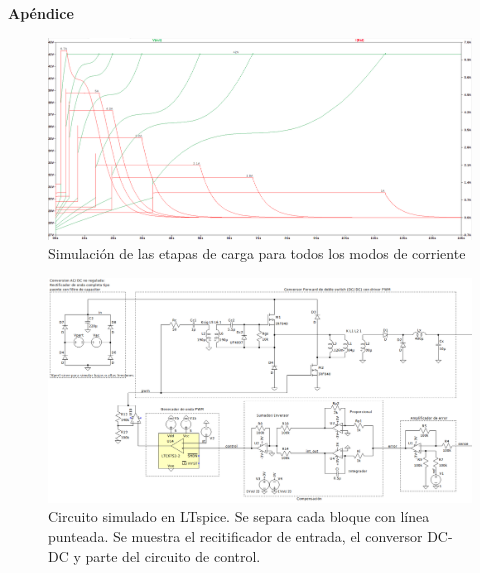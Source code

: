 \newpage
{}
\appendix
\begin{landscape}
\begin{center}
    \bfseries\LARGE Apéndice \par
\end{center}

\begin{figure}[hbt]
    \centering
    \includegraphics[width=\linewidth]{images/carga_completa_step.png}
    \caption{Simulación de las etapas de carga para todos los modos de corriente}
    \label{fig:simulacion_carga}
\end{figure}
    
\begin{figure}[hbt]
    \centering
    \includegraphics[width=\linewidth]{images/sim-full-1.png}
    \caption{Circuito simulado en LTspice. Se separa cada bloque con línea punteada. Se muestra el recitificador de entrada, el conversor DC-DC y parte del circuito de control.}
    \label{fig:sim-full-1}
\end{figure}


\end{landscape}
